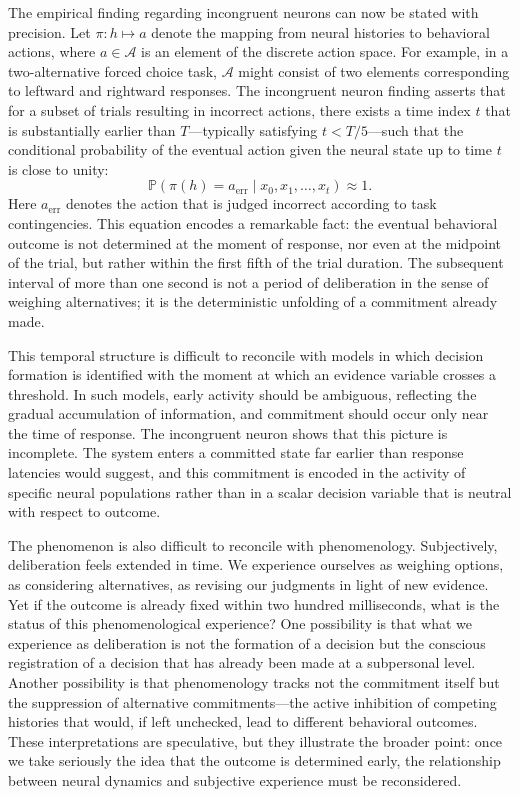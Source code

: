 \documentclass[11pt]{article}
\newcommand{\prob}{\mathbb{P}}
\begin{document}
The empirical finding regarding incongruent neurons can now be stated with precision. Let $\pi : h \mapsto a$ denote the mapping from neural histories to behavioral actions, where $a \in \mathcal{A}$ is an element of the discrete action space. For example, in a two-alternative forced choice task, $\mathcal{A}$ might consist of two elements corresponding to leftward and rightward responses. The incongruent neuron finding asserts that for a subset of trials resulting in incorrect actions, there exists a time index $t$ that is substantially earlier than $T$—typically satisfying $t < T/5$—such that the conditional probability of the eventual action given the neural state up to time $t$ is close to unity:
\[
\prob(\pi(h) = a_{\text{err}} \mid x_0, x_1, \ldots, x_t) \approx 1.
\]
Here $a_{\text{err}}$ denotes the action that is judged incorrect according to task contingencies. This equation encodes a remarkable fact: the eventual behavioral outcome is not determined at the moment of response, nor even at the midpoint of the trial, but rather within the first fifth of the trial duration. The subsequent interval of more than one second is not a period of deliberation in the sense of weighing alternatives; it is the deterministic unfolding of a commitment already made.

This temporal structure is difficult to reconcile with models in which decision formation is identified with the moment at which an evidence variable crosses a threshold. In such models, early activity should be ambiguous, reflecting the gradual accumulation of information, and commitment should occur only near the time of response. The incongruent neuron shows that this picture is incomplete. The system enters a committed state far earlier than response latencies would suggest, and this commitment is encoded in the activity of specific neural populations rather than in a scalar decision variable that is neutral with respect to outcome.

The phenomenon is also difficult to reconcile with phenomenology. Subjectively, deliberation feels extended in time. We experience ourselves as weighing options, as considering alternatives, as revising our judgments in light of new evidence. Yet if the outcome is already fixed within two hundred milliseconds, what is the status of this phenomenological experience? One possibility is that what we experience as deliberation is not the formation of a decision but the conscious registration of a decision that has already been made at a subpersonal level. Another possibility is that phenomenology tracks not the commitment itself but the suppression of alternative commitments—the active inhibition of competing histories that would, if left unchecked, lead to different behavioral outcomes. These interpretations are speculative, but they illustrate the broader point: once we take seriously the idea that the outcome is determined early, the relationship between neural dynamics and subjective experience must be reconsidered.
\end{document}
